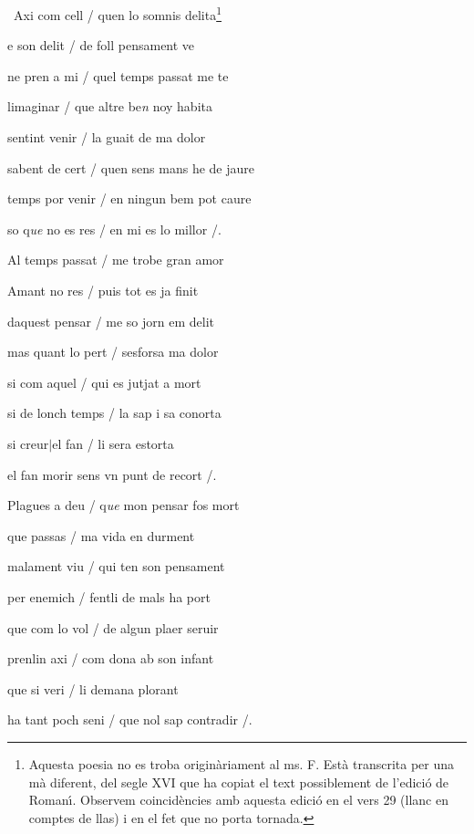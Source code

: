



\begin{estrofa}

 \textparagraph\ Axi com cell / quen lo somnis delita\footnote{Aquesta poesia no
es troba origin\`{a}riament al ms. F. Est\`{a} transcrita per una m\`{a}
diferent, del segle XVI que ha copiat el text possiblement de l'edici\'{o} de
Roman\'{\i}. Observem coincid\`{e}ncies amb aquesta edici\'{o} en el vers 29
(llanc en comptes de llas) i en el fet que no porta tornada.}

 e son delit / de foll pensament ve

 ne pren a mi / quel temps passat me te

 limaginar / que altre be\textit{n} noy habita

 sentint venir / la guait de ma dolor

 sabent de cert / quen sens mans he de jaure

 temps por venir / en ningun bem pot caure

 so q\textit{ue} no es res / en mi es lo millor /.

\end{estrofa}



\begin{estrofa}

 Al temps passat / me trobe gran amor

 Amant no res / puis tot es ja finit

 daquest pensar / me so jorn em delit

 mas quant lo pert / sesforsa ma dolor

 si com aquel / qui es jutjat a mort

 si de lonch temps / la sap i sa conorta

 si creur$\vert{}$el fan / li sera estorta

 el fan morir sens vn punt de recort /.

\end{estrofa}



\begin{estrofa}

 Plagues a deu / q\textit{ue} mon pensar fos mort

 que passas / ma vida en durment

 malament viu / qui ten son pensament

 per enemich / fentli de mals ha port

 que com lo vol / de algun plaer seruir

 prenlin axi / com dona ab son infant

 que si veri / li demana plorant

 ha tant poch seni / que nol sap contradir /.

\end{estrofa}



